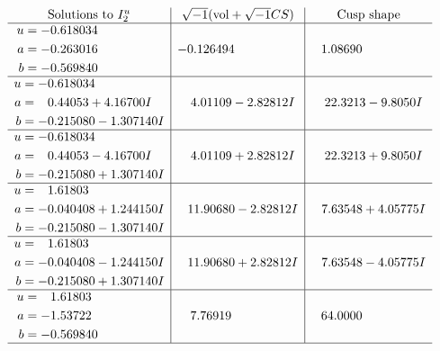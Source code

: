 \documentclass[1p]{elsarticle_modified}
\theoremstyle{definition}
\newcommand{\I}{\sqrt{-1}}
\begin{document}
$$\begin{array}{c|c|c}  
\text{Solutions to }I^u_{2}& \I (\text{vol} + \sqrt{-1}CS) & \text{Cusp shape}\\
 \hline 
\begin{aligned}
u &= -0.618034\phantom{ +0.000000I} \\
a &= -0.263016\phantom{ +0.000000I} \\
b &= -0.569840\phantom{ +0.000000I}\end{aligned}
 & -0.126494\phantom{ +0.000000I} & \phantom{-}1.08690\phantom{ +0.000000I} \\ \hline\begin{aligned}
u &= -0.618034\phantom{ +0.000000I} \\
a &= \phantom{-}0.44053 + 4.16700 I \\
b &= -0.215080 - 1.307140 I\end{aligned}
 & \phantom{-}4.01109 - 2.82812 I & \phantom{-}22.3213 - 9.8050 I \\ \hline\begin{aligned}
u &= -0.618034\phantom{ +0.000000I} \\
a &= \phantom{-}0.44053 - 4.16700 I \\
b &= -0.215080 + 1.307140 I\end{aligned}
 & \phantom{-}4.01109 + 2.82812 I & \phantom{-}22.3213 + 9.8050 I \\ \hline\begin{aligned}
u &= \phantom{-}1.61803\phantom{ +0.000000I} \\
a &= -0.040408 + 1.244150 I \\
b &= -0.215080 - 1.307140 I\end{aligned}
 & \phantom{-}11.90680 - 2.82812 I & \phantom{-}7.63548 + 4.05775 I \\ \hline\begin{aligned}
u &= \phantom{-}1.61803\phantom{ +0.000000I} \\
a &= -0.040408 - 1.244150 I \\
b &= -0.215080 + 1.307140 I\end{aligned}
 & \phantom{-}11.90680 + 2.82812 I & \phantom{-}7.63548 - 4.05775 I \\ \hline\begin{aligned}
u &= \phantom{-}1.61803\phantom{ +0.000000I} \\
a &= -1.53722\phantom{ +0.000000I} \\
b &= -0.569840\phantom{ +0.000000I}\end{aligned}
 & \phantom{-}7.76919\phantom{ +0.000000I} & \phantom{-}64.0000\phantom{ +0.000000I}\\
 \hline 
 \end{array}$$\newpage\newpage\renewcommand{\arraystretch}{1}
\end{document}
